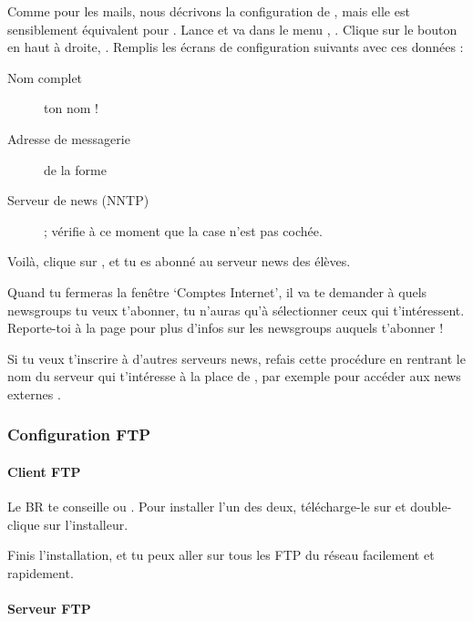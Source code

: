 Comme pour les mails, nous d\'ecrivons la configuration de , mais elle est sensiblement \'equivalent pour . Lance
 et va dans le menu , . Clique sur le bouton  en haut \`a droite,
. Remplis les \'ecrans de configuration suivants avec ces donn\'ees :

\begin{description}
  \item[Nom complet] ton nom !
  \item[Adresse de messagerie] de la forme 
  \item[Serveur de news (NNTP)] \fkz ; v\'erifie \`a ce moment que la case
        n'est pas coch\'ee.
\end{description}

Voil\`a, clique sur ,  et tu es abonn\'e
au serveur news des \'el\`eves.

Quand tu fermeras la fen\^etre `Comptes Internet', il va te demander \`a
quels newsgroups tu veux t'abonner, tu n'auras qu'\`a s\'electionner
ceux qui t'int\'eressent. Reporte-toi \`a la page \pageref{newsgroups}
pour plus d'infos sur les newsgroups auquels t'abonner !

Si tu veux t'inscrire \`a d'autres serveurs news, refais cette
proc\'edure en rentrant le nom du serveur qui t'int\'eresse \`a la place
de \fkz, par exemple pour acc\'eder aux news externes
.


\subsubsection{Configuration FTP}

\paragraph{Client FTP}

Le BR te conseille  ou . Pour installer l'un des deux, t\'el\'echarge-le sur \xshare et double-clique sur l'installeur.

Finis l'installation, et tu peux aller sur tous les FTP du r\'eseau
facilement et rapidement.

\paragraph{Serveur FTP}

